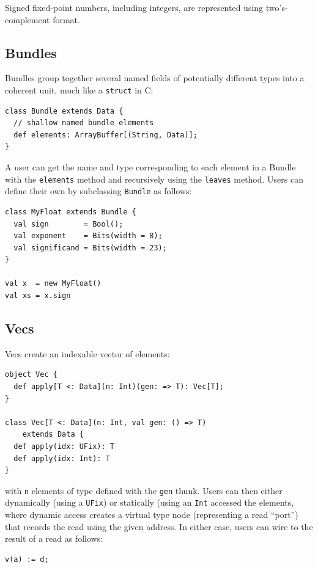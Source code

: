 \documentclass[10pt,twocolumn]{article}
\def\code#1{{\small\tt #1}}
\begin{document}
\noindent
Signed fixed-point
numbers, including integers, are represented using two's-complement
format.  

\subsection{Bundles}

Bundles group together several named fields of potentially different
types into a coherent unit, much like a \code{struct} in C:

\begin{lstlisting}
class Bundle extends Data {
  // shallow named bundle elements
  def elements: ArrayBuffer[(String, Data)];
}
\end{lstlisting}

\noindent
A user can get the name and type corresponding to each element in a
Bundle with the \code{elements} method and recursively using the
\code{leaves} method. 
Users can define their own by subclassing \code{Bundle} as follows:

\begin{lstlisting}
class MyFloat extends Bundle {
  val sign        = Bool();
  val exponent    = Bits(width = 8);
  val significand = Bits(width = 23);
}

val x  = new MyFloat()
val xs = x.sign
\end{lstlisting}

\subsection{Vecs}

Vecs create an indexable vector of elements: 

\begin{lstlisting}
object Vec {
  def apply[T <: Data](n: Int)(gen: => T): Vec[T];
}

class Vec[T <: Data](n: Int, val gen: () => T) 
    extends Data {
  def apply(idx: UFix): T
  def apply(idx: Int): T
}
\end{lstlisting}

\noindent
with \code{n} elements of type defined with the \code{gen} thunk.
Users can then either dynamically (using a \code{UFix}) or statically (using
an \code{Int} accessed the elements,
where dynamic access creates a virtual type node (representing a read
``port'') that records the read using the given address.  In either case,
users can wire to the result of a read as follows:

\begin{lstlisting}
v(a) := d;
\end{lstlisting}
\end{document}
